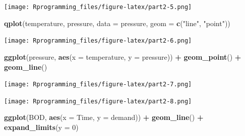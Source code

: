 \documentclass[10pt,]{krantz}
\makeatletter
\newenvironment{Shaded}{\begin{snugshade}}{\end{snugshade}}
\newcommand{\KeywordTok}[1]{\textcolor[rgb]{0.13,0.29,0.53}{\textbf{#1}}}
\newcommand{\DataTypeTok}[1]{\textcolor[rgb]{0.13,0.29,0.53}{#1}}
\newcommand{\DecValTok}[1]{\textcolor[rgb]{0.00,0.00,0.81}{#1}}
\newcommand{\StringTok}[1]{\textcolor[rgb]{0.31,0.60,0.02}{#1}}
\newcommand{\OperatorTok}[1]{\textcolor[rgb]{0.81,0.36,0.00}{\textbf{#1}}}
\newcommand{\NormalTok}[1]{#1}
\newenvironment{kframe}{%
\medskip{}
\setlength{\fboxsep}{.8em}
 \def\at@end@of@kframe{}%
 \ifinner\ifhmode%
  \def\at@end@of@kframe{\end{minipage}}%
  \begin{minipage}{\columnwidth}%
 \fi\fi%
 \def\FrameCommand##1{\hskip\@totalleftmargin \hskip-\fboxsep
 \colorbox{shadecolor}{##1}\hskip-\fboxsep
     \hskip-\linewidth \hskip-\@totalleftmargin \hskip\columnwidth}%
 \MakeFramed {\advance\hsize-\width
   \@totalleftmargin\z@ \linewidth\hsize
   \@setminipage}}%
 {\par\unskip\endMakeFramed%
 \at@end@of@kframe}
\renewenvironment{Shaded}{\begin{kframe}}{\end{kframe}}
\theoremstyle{definition}
\theoremstyle{definition}
\theoremstyle{remark}
\makeatother
\begin{document}
\texttt{[image: Rprogramming\_files/figure-latex/part2-5.png]}

\begin{Shaded}
\begin{Highlighting}[]


\KeywordTok{qplot}\NormalTok{(temperature, pressure, }\DataTypeTok{data =}\NormalTok{ pressure, }\DataTypeTok{geom =} \KeywordTok{c}\NormalTok{(}\StringTok{"line"}\NormalTok{, }\StringTok{"point"}\NormalTok{))}
\end{Highlighting}
\end{Shaded}

\texttt{[image: Rprogramming\_files/figure-latex/part2-6.png]}

\begin{Shaded}
\begin{Highlighting}[]


\KeywordTok{ggplot}\NormalTok{(pressure, }\KeywordTok{aes}\NormalTok{(}\DataTypeTok{x =}\NormalTok{ temperature, }\DataTypeTok{y =}\NormalTok{ pressure)) }\OperatorTok{+}\StringTok{ }\KeywordTok{geom_point}\NormalTok{() }\OperatorTok{+}\StringTok{ }\KeywordTok{geom_line}\NormalTok{()}
\end{Highlighting}
\end{Shaded}

\texttt{[image: Rprogramming\_files/figure-latex/part2-7.png]}

\begin{Shaded}
\end{Shaded}

\texttt{[image: Rprogramming\_files/figure-latex/part2-8.png]}

\begin{Shaded}
\begin{Highlighting}[]


\KeywordTok{ggplot}\NormalTok{(BOD, }\KeywordTok{aes}\NormalTok{(}\DataTypeTok{x =}\NormalTok{ Time, }\DataTypeTok{y =}\NormalTok{ demand)) }\OperatorTok{+}\StringTok{ }\KeywordTok{geom_line}\NormalTok{() }\OperatorTok{+}\StringTok{ }\KeywordTok{expand_limits}\NormalTok{(}\DataTypeTok{y =} \DecValTok{0}\NormalTok{)}
\end{Highlighting}
\end{Shaded}
\end{document}
